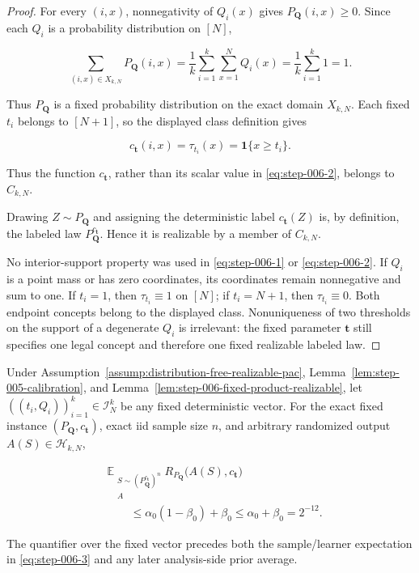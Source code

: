 \begin{proof}
For every \((i,x)\), nonnegativity of \(Q_i(x)\) gives
\(P_{\boldsymbol Q}(i,x)\ge0\). Since each \(Q_i\) is a probability
distribution on \([N]\),

\[
\sum_{(i,x)\in X_{k,N}}P_{\boldsymbol Q}(i,x)
=\frac1k\sum_{i=1}^k\sum_{x=1}^NQ_i(x)
=\frac1k\sum_{i=1}^k1
=1.
\tag{S6.1}\label{eq:step-006-1}
\]

Thus \(P_{\boldsymbol Q}\) is a fixed probability distribution on the
exact domain \(X_{k,N}\). Each fixed \(t_i\) belongs to \([N+1]\), so
the displayed class definition gives

\[
c_{\boldsymbol t}(i,x)=\tau_{t_i}(x)
=\mathbf 1\{x\ge t_i\}.
\tag{S6.2}\label{eq:step-006-2}
\]

Thus the function \(c_{\boldsymbol t}\), rather than its scalar value in
\eqref{eq:step-006-2}, belongs to \(C_{k,N}\).

Drawing \(Z\sim P_{\boldsymbol Q}\) and assigning the deterministic label
\(c_{\boldsymbol t}(Z)\) is, by definition, the labeled law
\(P_{\boldsymbol Q}^{c_{\boldsymbol t}}\). Hence it is realizable by a
member of \(C_{k,N}\).

No interior-support property was used in \eqref{eq:step-006-1} or \eqref{eq:step-006-2}. If \(Q_i\) is a point
mass or has zero coordinates, its coordinates remain nonnegative and sum to
one. If \(t_i=1\), then \(\tau_{t_i}\equiv1\) on \([N]\); if
\(t_i=N+1\), then \(\tau_{t_i}\equiv0\). Both endpoint concepts belong
to the displayed class. Nonuniqueness of two thresholds on the support of a
degenerate \(Q_i\) is irrelevant: the fixed parameter
\(\boldsymbol t\) still specifies one legal concept and therefore one
fixed realizable labeled law. \end{proof}

\begin{proposition}\label{prop:step-006-pointwise-pac-expectation}
Under Assumption~\ref{assump:distribution-free-realizable-pac}, Lemma~\ref{lem:step-005-calibration}, and
Lemma~\ref{lem:step-006-fixed-product-realizable}, let
\(((t_i,Q_i))_{i=1}^k\in\mathcal I_N^k\) be any fixed deterministic
vector. For the exact fixed instance
\((P_{\boldsymbol Q},c_{\boldsymbol t})\), exact iid sample size \(n\),
and arbitrary randomized output \(A(S)\in\mathcal H_{k,N}\),

\[
\begin{aligned}
&\mathbb E_{\substack{S\sim
  (P_{\boldsymbol Q}^{c_{\boldsymbol t}})^n\\ A}}
  R_{P_{\boldsymbol Q}}\bigl(A(S),c_{\boldsymbol t}\bigr)\\
&\qquad\le
  \alpha_0(1-\beta_0)+\beta_0
  \le\alpha_0+\beta_0
  =2^{-12}.
\end{aligned}
\tag{S6.3}\label{eq:step-006-3}
\]

The quantifier over the fixed vector precedes both the sample/learner
expectation in \eqref{eq:step-006-3} and any later analysis-side prior average.
\end{proposition}

